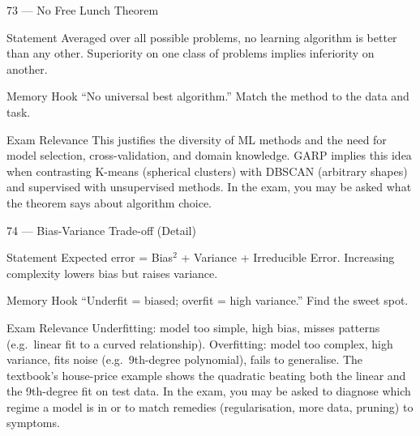 \documentclass[aspectratio=169,8pt]{beamer}
\begin{document}
	\begin{frame}{73 --- No Free Lunch Theorem}
		\begin{block}{Statement}
			Averaged over all possible problems, no learning algorithm is better than any other. Superiority on one class of problems implies inferiority on another.
		\end{block}
		\begin{block}{Memory Hook}
			``No universal best algorithm.'' Match the method to the data and task.
		\end{block}
		\begin{block}{Exam Relevance}
			This justifies the diversity of ML methods and the need for model selection, cross-validation, and domain knowledge. GARP implies this idea when contrasting K-means (spherical clusters) with DBSCAN (arbitrary shapes) and supervised with unsupervised methods. In the exam, you may be asked what the theorem says about algorithm choice.
		\end{block}
	\end{frame}
	
	\begin{frame}{74 --- Bias-Variance Trade-off (Detail)}
		\begin{block}{Statement}
			Expected error = Bias$^2$ + Variance + Irreducible Error. Increasing complexity lowers bias but raises variance.
		\end{block}
		\begin{block}{Memory Hook}
			``Underfit = biased; overfit = high variance.'' Find the sweet spot.
		\end{block}
		\begin{block}{Exam Relevance}
			Underfitting: model too simple, high bias, misses patterns (e.g.\ linear fit to a curved relationship). Overfitting: model too complex, high variance, fits noise (e.g.\ 9th-degree polynomial), fails to generalise. The textbook's house-price example shows the quadratic beating both the linear and the 9th-degree fit on test data. In the exam, you may be asked to diagnose which regime a model is in or to match remedies (regularisation, more data, pruning) to symptoms.
		\end{block}
	\end{frame}
	
\end{document}
